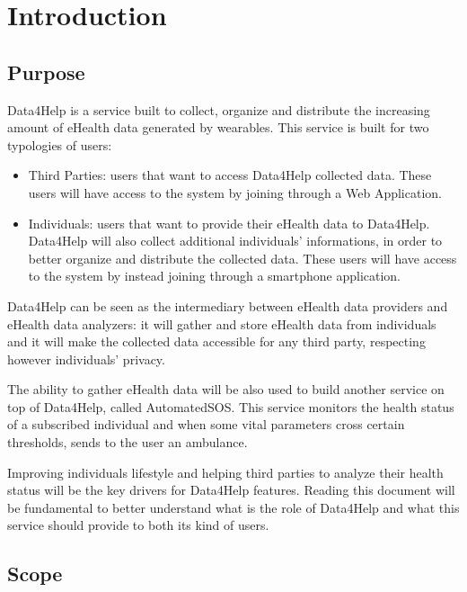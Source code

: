 
\chapter{Introduction}
\section{Purpose}
Data4Help is a service built to collect, organize and distribute the increasing amount of eHealth data generated by wearables.
\givespace
This service is built for two typologies of users:
\begin{itemize}
\item Third Parties: users that want to access Data4Help collected data. These users will have access to the system by joining through a Web Application.
\item Individuals: users that want to provide their eHealth data to Data4Help. Data4Help will also collect additional individuals' informations, in order to better organize and distribute the collected data.
These users will have access to the system by instead joining through a smartphone application.
\end{itemize}
Data4Help can be seen as the intermediary between eHealth data providers and eHealth data analyzers: it will gather  and store eHealth data from individuals and it will make the collected data accessible for any third party, respecting however individuals' privacy.
\givespace

The ability to gather eHealth data will be also used to build another service on top of Data4Help, called AutomatedSOS.
This service monitors the health status of a subscribed individual and when some vital parameters cross certain thresholds, sends to the user an ambulance.
\givespace

Improving individuals lifestyle and helping third parties to analyze their health status will be the key drivers for Data4Help features.
\givespace
Reading this document will be fundamental to better understand what is the role of Data4Help and what this service should provide to both its kind of users.





\section{Scope}
